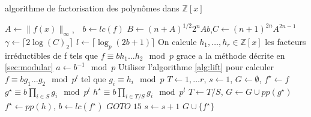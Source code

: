 \begin{algorithm}
  \caption{algorithme de factorisation des polynômes dans $\mathbb{Z}[x]$}
  \label{alg:hensel}  
  \begin{algorithmic}[1]
    \Statex
        \State {}
      \EndIf
      \State $A \gets \|f(x)\|_{\infty}$,\qquad\qquad \quad \ \  $b \gets lc(f)$
      \State $B \gets (n+A)^{1/2}2^nAb$,\qquad $C \gets (n+1)^{2n}A^{2n-1}$
      \State $\gamma \gets \lceil 2\log(C)_2 \rceil$
      \Statex
      \Repeat
      \State $l \gets \lceil \log_p(2b+1) \rceil $
      \State On calcule $h_1, \dots, h_r \in \mathbb{Z}[x]$ les facteurs irréductibles de f tels que $f \equiv bh_1\dots h_2 \mod p$
            grace a la méthode décrite en \ref{sec:modular}
      \Statex
      \State $a \gets b^{-1} \mod p$
      \State Utiliser l'algorithme \ref{alg:lift} pour calculer $f \equiv bg_1 \dots g_2 \mod p^l$ tel que $g_i \equiv h_i \mod p$
      \Statex
      \State $T \gets {1,\dots r}$, $s \gets 1$, $G \gets \emptyset$, $f^{\star} \gets f$
          \State $g^{\star} \equiv b\prod_{i\in S} g_i \mod p^l$
          \State $h^{\star} \equiv b\prod_{i \in T/S} g_i \mod p^l$
            \State $T \gets T/S$, $G \gets G \cup {pp(g^{\star})}$
            \State $f^{\star} \gets pp(h)$, $b \gets lc(f^{\star})$
            \State $GOTO\; 15$
          \EndIf
        \EndFor
        \State $s \gets s+1$
      \EndWhile
      \State \Return $G \cup \{f^{\star}\}$
    \EndFunction
  \end{algorithmic}
\end{algorithm}
